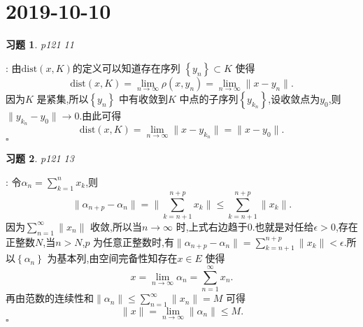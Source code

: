 \documentclass[a4paper]{article}
\newtheorem*{exe}{习题}
\newenvironment{sol}{{\noindent\bfseries 解}:}{\hfill $\square$\par}
\begin{document}
\section{2019-10-10}
\begin{exe}
  p121 11
\end{exe}
\begin{sol}
  由$\text{dist}(x,K)$的定义可以知道存在序列 $\left\{ y_n \right\}\subset K $ 使得
  \[
    \text{dist}(x,K)=\lim_{n \to \infty} \rho(x,y_n)=\lim_{n \to \infty} \|x-y_n\| 
  .\] 
  因为$K$ 是紧集,所以$\left\{ y_n \right\} $ 中有收敛到$K$ 中点的子序列$\left\{ y_{k_n} \right\} $,设收敛点为$y_0$,则 $\|y_{k_n}-y_0\|\to 0$.由此可得
  \[
    \text{dist}(x,K)=\lim_{n \to \infty} \|x-y_{k_n}\|= \|x-y_0\|
  .\] 
\end{sol}
\begin{exe}
  p121 13
\end{exe}
\begin{sol}
  令$\alpha_n=\sum_{k=1}^{n} x_k$,则
  \[
  \|\alpha_{n+p}-\alpha_n\|=\|\sum_{k=n+1}^{n+p} x_k\|\le \sum_{k=n+1}^{n+p} \|x_k\|
  .\] 
  因为$\sum_{n=1}^{\infty} \|x_n\|$ 收敛,所以当$n\to \infty$ 时,上式右边趋于0.也就是对任给$\epsilon >0$,存在正整数$N$,当$n>N$,$p$ 为任意正整数时,有$\|\alpha_{n+p}-\alpha_{n}\|=\sum_{k=n+1}^{n+p} \|x_k\|<\epsilon $.所以$\left\{ \alpha_n \right\} $ 为基本列,由空间完备性知存在$x\in E$ 使得
  \[
  x=\lim_{n \to \infty} \alpha_n=\sum_{n=1}^{\infty} x_n
  .\] 
  再由范数的连续性和$\|\alpha_n\|\le \sum_{n=1}^{\infty} \|x_n\|=M$ 可得
  \[
 \|x\|=\lim_{n \to \infty} \|\alpha_n\|\le M
  .\] 
\end{sol}
\end{document}
